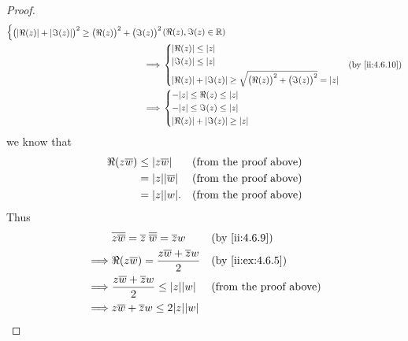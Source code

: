 \begin{proof}
\begin{align*}
\begin{dcases}
                 \big(\abs{\Re(z)} + \abs{\Im(z)}\big)^2 \geq \big(\Re(z)\big)^2 + \big(\Im(z)\big)^2
               \end{dcases} & (\Re(z), \Im(z) \in \R) \\
    \implies & \begin{dcases}
                 \abs{\Re(z)} \leq \abs{z} \\
                 \abs{\Im(z)} \leq \abs{z} \\
                 \abs{\Re(z)} + \abs{\Im(z)} \geq \sqrt{\big(\Re(z)\big)^2 + \big(\Im(z)\big)^2} = \abs{z}
               \end{dcases}                                                    &                         & \by{ii:4.6.10}                                  \\
    \implies & \begin{dcases}
                 -\abs{z} \leq \Re(z) \leq \abs{z} \\
                 -\abs{z} \leq \Im(z) \leq \abs{z} \\
                 \abs{\Re(z)} + \abs{\Im(z)} \geq \abs{z}
               \end{dcases}
  \end{align*}
  we know that
  \begin{align*}
    \Re(z \overline{w}) & \leq \abs{z \overline{w}}    &  & \text{(from the proof above)} \\
                        & = \abs{z} \abs{\overline{w}} &  & \text{(from the proof above)} \\
                        & = \abs{z} \abs{w}.           &  & \text{(from the proof above)}
  \end{align*}
  Thus
  \begin{align*}
             & \overline{z \overline{w}} = \overline{z} \; \overline{\overline{w}} = \overline{z} w                   &                                        & \by{ii:4.6.9}                 \\
    \implies & \Re(z \overline{w}) = \dfrac{z \overline{w} + \overline{z} w}{2}                                       &                                        & \by{ii:ex:4.6.5}              \\
    \implies & \dfrac{z \overline{w} + \overline{z} w}{2} \leq \abs{z} \abs{w}                                        &                                        & \text{(from the proof above)} \\
    \implies & z \overline{w} + \overline{z} w \leq 2 \abs{z} \abs{w}                                                                                                                          \\

\end{align*}
\end{proof}
